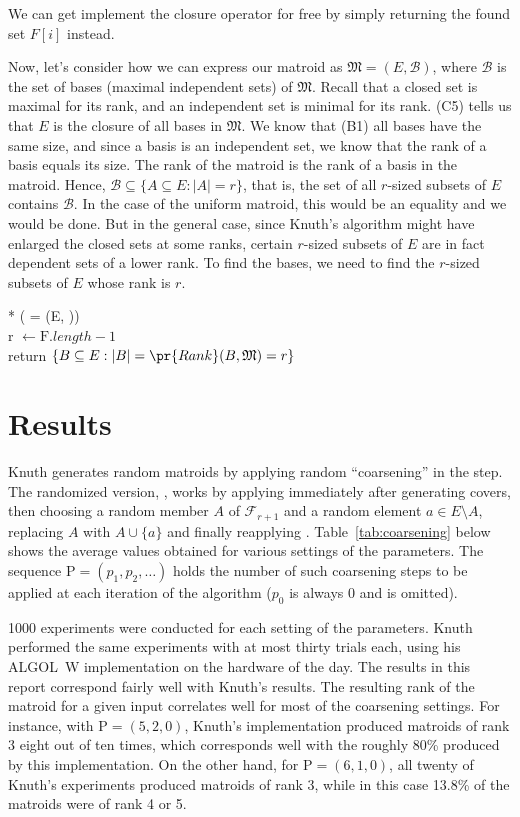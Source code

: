 We can get implement the closure operator for free by simply returning the found set $F[i]$ instead.

Now, let's consider how we can express our matroid as $\mathfrak{M} = (E, \mathcal{B})$, where $\mathcal{B}$ is the set of bases (maximal independent sets) of $\mathfrak{M}$. Recall that a closed set is maximal for its rank, and an independent set is minimal for its rank. (C5) tells us that $E$ is the closure of all bases in $\mathfrak{M}$. We know that (B1) all bases have the same size, and since a basis is an independent set, we know that the rank of a basis equals its size. The rank of the matroid is the rank of a basis in the matroid. Hence, $\mathcal{B} \subseteq \{ A\subseteq E: |A| = r\}$, that is, the set of all $r$-sized subsets of $E$ contains $\mathcal{B}$. In the case of the uniform matroid, this would be an equality and we would be done. But in the general case, since Knuth's algorithm might have enlarged the closed sets at some ranks, certain $r$-sized subsets of $E$ are in fact dependent sets of a lower rank. To find the bases, we need to find the $r$-sized subsets of $E$ whose rank is $r$.

\begin{pseudo}*
  ({ = (E, )}) \\
  r $\leftarrow \mathrm{F}.length - 1$ \\
  return $\{ B \subseteq E : |B| = \pr{Rank}(B, \mathfrak{M}) = r \}$
\end{pseudo}

\section*{Results}
Knuth generates random matroids by applying random ``coarsening'' in the  step. The randomized version, , works by applying  immediately after generating covers, then choosing a random member $A$ of $\mathcal{F}_{r+1}$ and a random element $a \in E \setminus A$, replacing $A$ with $A \cup \{a\}$ and finally reapplying . Table~\ref{tab:coarsening} below shows the average values obtained for various settings of the parameters. The sequence $\mathrm{P} = (p_1, p_2, \ldots)$ holds the number of such coarsening steps to be applied at each iteration of the algorithm ($p_0$ is always 0 and is omitted).

1000 experiments were conducted for each setting of the parameters. Knuth performed the same experiments with at most thirty trials each, using his ALGOL~W implementation on the hardware of the day. The results in this report correspond fairly well with Knuth's results. The resulting rank of the matroid for a given input correlates well for most of the coarsening settings. For instance, with $\mathrm{P} = (5,2,0)$, Knuth's implementation produced matroids of rank 3 eight out of ten times, which corresponds well with the roughly 80\% produced by this implementation. On the other hand, for $\mathrm{P} = (6,1,0)$, all twenty of Knuth's experiments produced matroids of rank 3, while in this case 13.8\% of the matroids were of rank 4 or 5.

